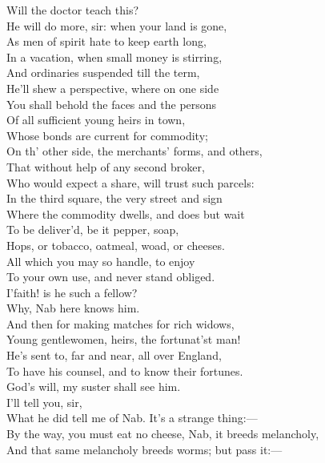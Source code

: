 \documentclass[a4paper,oneside]{memoir}
\begin{document}
\begin{drama*}
\kastrilspeaks {} Will the doctor teach this?\\
\facespeaks He will do more, sir: when your land is gone,\\
As men of spirit hate to keep earth long,\\
In a vacation, when small money is stirring,\\
And ordinaries suspended till the term,\\
He'll shew a perspective, where on one side\\
You shall behold the faces and the persons\\
Of all sufficient young heirs in town,\\
Whose bonds are current for commodity;\\
On th' other side, the merchants' forms, and others,\\
That without help of any second broker,\\
Who would expect a share, will trust such parcels:\\
In the third square, the very street and sign\\
Where the commodity dwells, and does but wait\\
To be deliver'd, be it pepper, soap,\\
Hops, or tobacco, oatmeal, woad, or cheeses.\\
All which you may so handle, to enjoy\\
To your own use, and never stand obliged.\\
\kastrilspeaks I'faith! is he such a fellow?\\
\facespeaks {} Why, Nab here knows him.\\
And then for making matches for rich widows,\\
Young gentlewomen, heirs, the fortunat'st man!\\
He's sent to, far and near, all over England,\\
To have his counsel, and to know their fortunes.\\
\kastrilspeaks God's will, my suster shall see him.\\
\facespeaks {} I'll tell you, sir,\\
What he did tell me of Nab. It's a strange thing:---\\
By the way, you must eat no cheese, Nab, it breeds melancholy,\\
And that same melancholy breeds worms; but pass it:---\\

\end{drama*}
\end{document}

